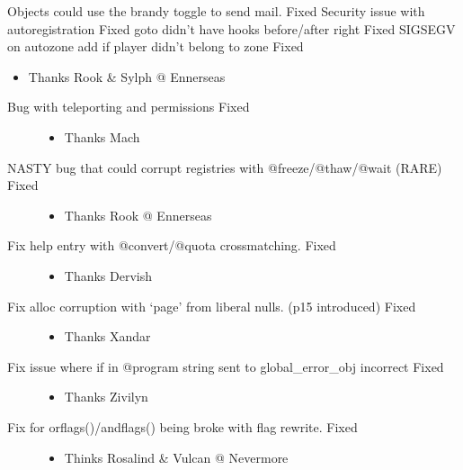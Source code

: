 \documentclass[letterpaper,10pt,english]{sphinxmanual}
\begin{document}
\sphinxAtStartPar
Objects could use the brandy toggle to send mail.  \sphinxhyphen{} Fixed
Security issue with autoregistration \sphinxhyphen{} Fixed
goto didn’t have hooks before/after right \sphinxhyphen{} Fixed
SIGSEGV on autozone add if player didn’t belong to zone \sphinxhyphen{} Fixed
\begin{itemize}
\item {} 
\sphinxAtStartPar
Thanks Rook \& Sylph @ Ennerseas

\end{itemize}
\begin{description}
\item[{Bug with teleporting and permissions \sphinxhyphen{} Fixed}] \leavevmode\begin{itemize}
\item {} 
\sphinxAtStartPar
Thanks Mach 

\end{itemize}

\item[{NASTY bug that could corrupt registries with @freeze/@thaw/@wait (RARE) \sphinxhyphen{} Fixed}] \leavevmode\begin{itemize}
\item {} 
\sphinxAtStartPar
Thanks Rook @ Ennerseas

\end{itemize}

\item[{Fix help entry with @convert/@quota cross\sphinxhyphen{}matching. \sphinxhyphen{} Fixed}] \leavevmode\begin{itemize}
\item {} 
\sphinxAtStartPar
Thanks Dervish

\end{itemize}

\item[{Fix alloc corruption with ‘page’ from liberal nulls. (p15 introduced) \sphinxhyphen{} Fixed}] \leavevmode\begin{itemize}
\item {} 
\sphinxAtStartPar
Thanks Xandar

\end{itemize}

\item[{Fix issue where if in @program string sent to global\_error\_obj incorrect \sphinxhyphen{} Fixed}] \leavevmode\begin{itemize}
\item {} 
\sphinxAtStartPar
Thanks Zivilyn

\end{itemize}

\item[{Fix for orflags()/andflags() being broke with flag rewrite. \sphinxhyphen{} Fixed}] \leavevmode\begin{itemize}
\item {} 
\sphinxAtStartPar
Thinks Rosalind \& Vulcan @ Nevermore

\end{itemize}

\end{description}
\end{document}
